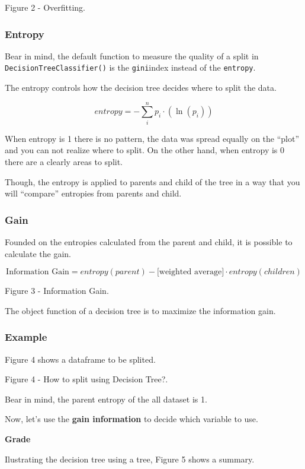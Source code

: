 \documentclass[]{book}
\begin{document}
Figure 2 - Overfitting.

\subsubsection{Entropy}\label{entropy}

Bear in mind, the default function to measure the quality of a split in
\texttt{DecisionTreeClassifier()} is the \texttt{gini}index instead of
the \texttt{entropy}.

The entropy controls how the decision tree decides where to split the
data.

\[entropy = - \sum_i^n p_i \cdot (\ln(p_i))\]

When entropy is 1 there is no pattern, the data was spread equally on
the ``plot'' and you can not realize where to split. On the other hand,
when entropy is 0 there are a clearly areas to split.

Though, the entropy is applied to parents and child of the tree in a way
that you will ``compare'' entropies from parents and child.

\subsubsection{Gain}\label{gain}

Founded on the entropies calculated from the parent and child, it is
possible to calculate the gain.

\[\text{Information Gain} = entropy(parent) - [\text{weighted average]} \cdot entropy(children)\]

Figure 3 - Information Gain.

The object function of a decision tree is to maximize the information
gain.

\subsubsection{Example}\label{example}

Figure 4 shows a dataframe to be splited.

Figure 4 - How to split using Decision Tree?.

Bear in mind, the parent entropy of the all dataset is 1.

Now, let's use the \textbf{gain information} to decide which variable to
use.

\textbf{Grade}

Ilustrating the decision tree using a tree, Figure 5 shows a summary.
\end{document}
